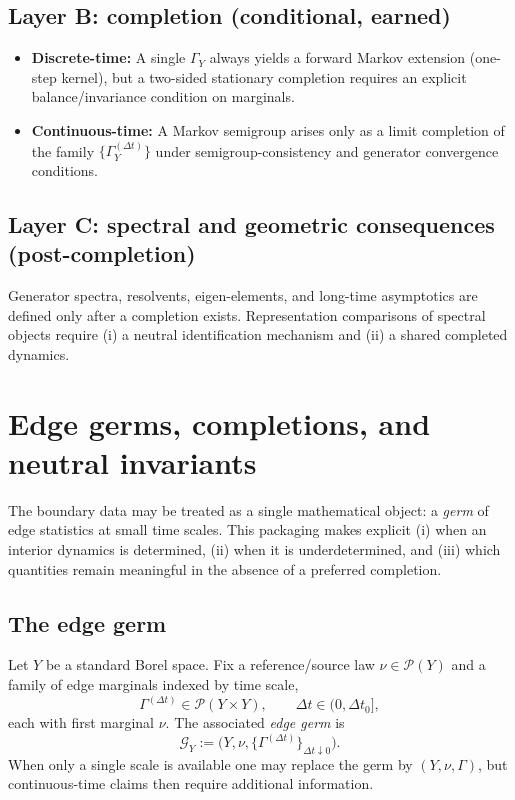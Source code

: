 \documentclass[11pt]{article}
\begin{document}
\subsection*{Layer B: completion (conditional, earned)}
\begin{itemize}[leftmargin=1.6em]
\item \textbf{Discrete-time:} A single $\Gamma_Y$ always yields a forward Markov extension (one-step kernel),
but a two-sided stationary completion requires an explicit balance/invariance condition on marginals.
\item \textbf{Continuous-time:} A Markov semigroup arises only as a limit completion of the family
$\{\Gamma_Y^{(\Delta t)}\}$ under semigroup-consistency and generator convergence conditions.
\end{itemize}

\subsection*{Layer C: spectral and geometric consequences (post-completion)}
Generator spectra, resolvents, eigen-elements, and long-time asymptotics are defined only after a
completion exists. Representation comparisons of spectral objects require (i) a neutral identification
mechanism and (ii) a shared completed dynamics.

\section{Edge germs, completions, and neutral invariants}
\label{sec:edge-germs}

The boundary data may be treated as a single mathematical object: a \emph{germ} of edge statistics at
small time scales. This packaging makes explicit (i) when an interior dynamics is determined,
(ii) when it is underdetermined, and (iii) which quantities remain meaningful in the absence of a
preferred completion.

\subsection{The edge germ}
Let $Y$ be a standard Borel space. Fix a reference/source law $\nu\in\mathcal P(Y)$ and a family of
edge marginals indexed by time scale,
\[
  \Gamma^{(\Delta t)} \in \mathcal P(Y\times Y), \qquad \Delta t\in(0,\Delta t_0],
\]
each with first marginal $\nu$. The associated \emph{edge germ} is
\begin{equation}
  \mathcal G_Y := \big(Y,\nu,\{\Gamma^{(\Delta t)}\}_{\Delta t\downarrow 0}\big).
  \label{eq:edge-germ}
\end{equation}
When only a single scale is available one may replace the germ by $(Y,\nu,\Gamma)$, but continuous-time
claims then require additional information.
\end{document}
